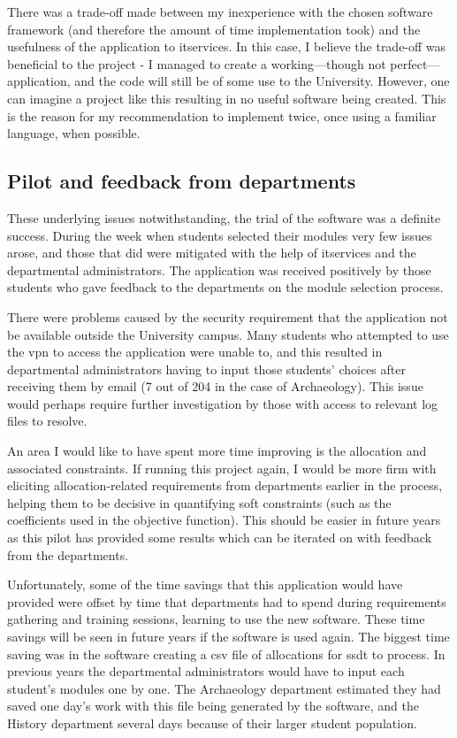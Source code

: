 There was a trade-off made between my inexperience with the chosen software
framework (and therefore the amount of time implementation took) and the
usefulness of the application to \gls{itservices}. In this case, I believe the
trade-off was beneficial to the project - I managed to create a
working---though not perfect---application, and the code will still be of some
use to the University. However, one can imagine a project like this resulting
in no useful software being created. This is the reason for my recommendation
to implement twice, once using a familiar language, when possible.

\subsection{Pilot and feedback from departments}

These underlying issues notwithstanding, the trial of the software was a
definite success. During the week when students selected their modules very
few issues arose, and those that did were mitigated with the help of
\gls{itservices} and the departmental administrators. The application was
received positively by those students who gave feedback to the departments on
the module selection process.

There were problems caused by the security requirement that the application
not be available outside the University campus. Many students who attempted to
use the \gls{vpn} to access the application were unable to, and this resulted
in departmental administrators having to input those students' choices after
receiving them by email (7 out of 204 in the case of Archaeology). This issue
would perhaps require further investigation by those with access to relevant
log files to resolve.

An area I would like to have spent more time improving is the allocation and
associated constraints. If running this project again, I would be more firm
with eliciting allocation-related requirements from departments earlier in the
process, helping them to be decisive in quantifying soft constraints (such as
the coefficients used in the objective function). This should be easier in
future years as this pilot has provided some results which can be iterated on
with feedback from the departments.

Unfortunately, some of the time savings that this application would have
provided were offset by time that departments had to spend during requirements
gathering and training sessions, learning to use the new software. These time
savings will be seen in future years if the software is used again. The
biggest time saving was in the software creating a \gls{csv} file of
allocations for \gls{ssdt} to process. In previous years the departmental
administrators would have to input each student's modules one by one. The
Archaeology department estimated they had saved one day's work with this file
being generated by the software, and the History department several days
because of their larger student population.

